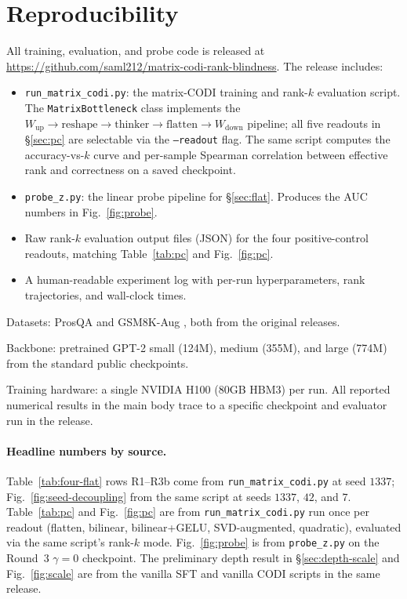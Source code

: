 \section{Reproducibility}
\label{sec:repro}

All training, evaluation, and probe code is released
at \url{https://github.com/saml212/matrix-codi-rank-blindness}.
The release includes:

\begin{itemize}
\setlength\itemsep{2pt}
\item \texttt{run\_matrix\_codi.py}: the matrix-CODI training
      and rank-$k$ evaluation script. The
      \texttt{MatrixBottleneck} class implements the
      $W_{\text{up}}\!\to\!\text{reshape}\!\to\!\text{thinker}\!\to\!\text{flatten}\!\to\!W_{\text{down}}$
      pipeline; all five readouts in \S\ref{sec:pc} are selectable
      via the \texttt{--readout} flag. The same script computes the
      accuracy-vs-$k$ curve and per-sample Spearman correlation
      between effective rank and correctness on a saved checkpoint.
\item \texttt{probe\_z.py}: the linear probe pipeline for
      \S\ref{sec:flat}. Produces the AUC numbers in
      Fig.~\ref{fig:probe}.
\item Raw rank-$k$ evaluation output files (JSON) for the four
      positive-control readouts, matching Table~\ref{tab:pc} and
      Fig.~\ref{fig:pc}.
\item A human-readable experiment log with per-run hyperparameters,
      rank trajectories, and wall-clock times.
\end{itemize}

Datasets: ProsQA \citep{hao2024coconut} and GSM8K-Aug
\citep{shen2025codi}, both from the original releases.

Backbone: pretrained GPT-2 small (124M), medium (355M), and large
(774M) from the standard public checkpoints.

Training hardware: a single NVIDIA H100 (80GB HBM3) per run. All
reported numerical results in the main body trace to a specific
checkpoint and evaluator run in the release.

\paragraph{Headline numbers by source.} Table~\ref{tab:four-flat}
rows R1--R3b come from \texttt{run\_matrix\_codi.py} at seed
$1337$; Fig.~\ref{fig:seed-decoupling} from the same script at
seeds $1337$, $42$, and $7$. Table~\ref{tab:pc} and
Fig.~\ref{fig:pc} are from \texttt{run\_matrix\_codi.py} run once
per readout (flatten, bilinear, bilinear+GELU, SVD-augmented,
quadratic), evaluated via the same script's rank-$k$ mode.
Fig.~\ref{fig:probe} is from \texttt{probe\_z.py} on the Round~3
$\gamma\!=\!0$ checkpoint. The preliminary depth result in
\S\ref{sec:depth-scale} and Fig.~\ref{fig:scale} are from the
vanilla SFT and vanilla CODI scripts in the same release.
